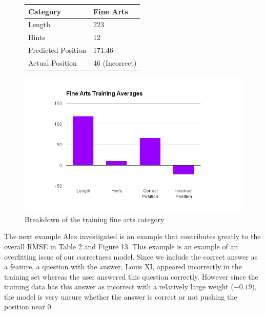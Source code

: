 \documentclass[letterpaper]{article}
\begin{document}
\begin{figure}[H]
\centering
\begin{minipage}[t]{.4\textwidth}
\centering
\vspace{0pt}

\begin{tabular}{|l|l |}
\hline
Category & Fine Arts \\ \hline
Length &  223 \\
Hints & 12 \\
Predicted Position & 171.46 \\
Actual Position & 46 (Incorrect) \\ \hline

\end{tabular}
\label{table:ex_art}
\end{minipage}\hfill
\begin{minipage}[t]{.4\textwidth}
\centering
\vspace{0pt}
\includegraphics[width=\textwidth]{finearts.png}
\caption{Breakdown of the training fine arts category}
\label{fig:mircoFA}
\end{minipage}

\end{figure}

The next example Alex investigated is an example that contributes greatly to the overall RMSE in Table 2 and Figure 13.  This example is an example of an overfitting issue of our correctness model.  Since we include the correct answer as a feature, a question with the answer, Louis XI, appeared incorrectly in the training set whereas the user answered this question correctly.  However since the training data has this answer as incorrect with a relatively large weight ($-0.19$), the model is very unsure whether the answer is correct or not pushing the position near $0$. 
\end{document}
